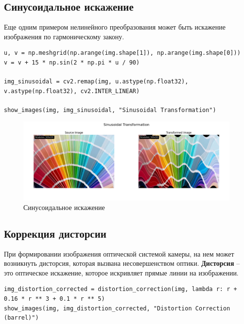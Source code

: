 \subsection{Синусоидальное искажение}

Еще одним примером нелинейного преобразования может быть искажение изображения по гармоническому закону.

\begin{lstlisting}[style=python_white, caption={Исходный код для синусоидального искажения}]
u, v = np.meshgrid(np.arange(img.shape[1]), np.arange(img.shape[0]))
v = v + 15 * np.sin(2 * np.pi * u / 90)

img_sinusoidal = cv2.remap(img, u.astype(np.float32), v.astype(np.float32), cv2.INTER_LINEAR)

show_images(img, img_sinusoidal, "Sinusoidal Transformation")
\end{lstlisting}

\begin{figure}[ht]
    \includegraphics[width=\textwidth]{../results/Sinusoidal Transformation.png}
    \caption{Синусоидальное искажение}
    \label{fig:sinusoidal_image}
\end{figure}

\subsection{Коррекция дисторсии}

При формировании изображения оптической системой камеры, на нем может возникнуть дисторсия, которая вызвана несовершенством оптики.
\textbf{Дисторсия} -- это оптическое искажение, которое искривляет прямые линии на изображении.

\begin{lstlisting}[style=python_white, caption={Исходный код для коррекции бочкообразной дисторсии}]
img_distortion_corrected = distortion_correction(img, lambda r: r + 0.16 * r ** 3 + 0.1 * r ** 5)
show_images(img, img_distortion_corrected, "Distortion Correction (barrel)")
\end{lstlisting}

